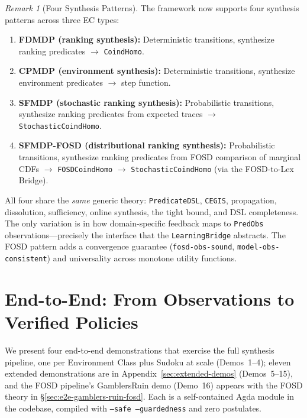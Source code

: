 \documentclass[9pt,a4paper]{article}
\theoremstyle{plain}
\theoremstyle{definition}
\theoremstyle{remark}
\newtheorem{remark}{Remark}
\begin{document}
\begin{remark}[Four Synthesis Patterns]
The framework now supports four synthesis patterns across three EC types:
\begin{enumerate}
\item \textbf{FDMDP (ranking synthesis):} Deterministic transitions, synthesize ranking predicates $\to$ \texttt{CoindHomo}.
\item \textbf{CPMDP (environment synthesis):} Deterministic transitions, synthesize environment predicates $\to$ step function.
\item \textbf{SFMDP (stochastic ranking synthesis):} Probabilistic transitions, synthesize ranking predicates from expected traces $\to$ \texttt{StochasticCoindHomo}.
\item \textbf{SFMDP-FOSD (distributional ranking synthesis):} Probabilistic transitions, synthesize ranking predicates from FOSD comparison of marginal CDFs $\to$ \texttt{FOSDCoindHomo} $\to$ \texttt{StochasticCoindHomo} (via the FOSD-to-Lex Bridge).
\end{enumerate}
All four share the \emph{same} generic theory: \texttt{PredicateDSL}, \texttt{CEGIS}, propagation, dissolution, sufficiency, online synthesis, the tight bound, and DSL completeness.
The only variation is in how domain-specific feedback maps to \texttt{PredObs} observations---precisely the interface that the \texttt{LearningBridge} abstracts.  The FOSD pattern adds a convergence guarantee (\texttt{fosd-obs-sound}, \texttt{model-obs-consistent}) and universality across monotone utility functions.
\end{remark}



\section{End-to-End: From Observations to Verified Policies}
\label{sec:e2e}

We present four end-to-end demonstrations that exercise the full synthesis pipeline, one per Environment Class plus Sudoku at scale (Demos~1--4); eleven extended demonstrations are in Appendix~\ref{sec:extended-demos} (Demos~5--15), and the FOSD pipeline's GamblersRuin demo (Demo~16) appears with the FOSD theory in \S\ref{sec:e2e-gamblers-ruin-fosd}.  Each is a self-contained Agda module in the codebase, compiled with \texttt{--safe --guardedness} and zero postulates.
\end{document}
